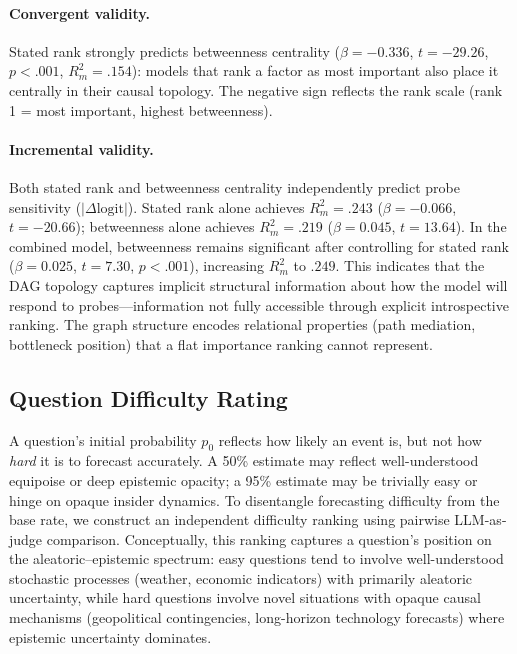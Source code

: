 \documentclass[11pt]{article}
\begin{document}
\paragraph{Convergent validity.} Stated rank strongly predicts betweenness centrality ($\beta = -0.336$, $t = -29.26$, $p < .001$, $R^2_m = .154$): models that rank a factor as most important also place it centrally in their causal topology. The negative sign reflects the rank scale (rank 1 = most important, highest betweenness).

\paragraph{Incremental validity.} Both stated rank and betweenness centrality independently predict probe sensitivity ($|\Delta\text{logit}|$). Stated rank alone achieves $R^2_m = .243$ ($\beta = -0.066$, $t = -20.66$); betweenness alone achieves $R^2_m = .219$ ($\beta = 0.045$, $t = 13.64$). In the combined model, betweenness remains significant after controlling for stated rank ($\beta = 0.025$, $t = 7.30$, $p < .001$), increasing $R^2_m$ to $.249$. This indicates that the DAG topology captures implicit structural information about how the model will respond to probes---information not fully accessible through explicit introspective ranking. The graph structure encodes relational properties (path mediation, bottleneck position) that a flat importance ranking cannot represent.



\subsection{Question Difficulty Rating}
\label{app:difficulty}

A question's initial probability $p_0$ reflects how likely an event is, but not how \emph{hard} it is to forecast accurately.
A 50\% estimate may reflect well-understood equipoise or deep epistemic opacity; a 95\% estimate may be trivially easy or hinge on opaque insider dynamics.
To disentangle forecasting difficulty from the base rate, we construct an independent difficulty ranking using pairwise LLM-as-judge comparison.
Conceptually, this ranking captures a question's position on the aleatoric--epistemic spectrum: easy questions tend to involve well-understood stochastic processes (weather, economic indicators) with primarily aleatoric uncertainty, while hard questions involve novel situations with opaque causal mechanisms (geopolitical contingencies, long-horizon technology forecasts) where epistemic uncertainty dominates.
\end{document}
